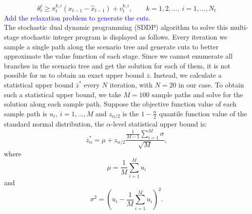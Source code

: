 \documentclass[12pt]{article}
\begin{document}
	\begin{equation}
		\theta_t^i \geq \pi_t^{k,i}(x_{t-1} - \hat{x}_{t-1}) + v_t^{k,i}, \qquad k = 1, 2, \dots,\ i = 1, \dots, N_t
	\end{equation}
	\textcolor{blue}{Add the relaxation problem to generate the cuts.}\\
	\newline
	The stochastic dual dynamic programming (SDDP) algorithm to solve this multi-stage stochastic integer program is displayed as follows. Every iteration we sample a single path along the scenario tree and generate cuts to better approximate the value function of each stage. Since we cannot enumerate all branches in the scenario tree and get the solution for each of them, it is not possible for us to obtain an exact upper bound \(\overline{z}\). Instead, we calculate a statistical upper bound \(\overline{z}^*\) every \(N\) iteration, with \(N = 20\) in our case. To obtain such a statistical upper bound, we take \(M = 100\) sample paths and solve for the solution along each sample path. Suppose the objective function value of each sample path is \(u_i,\ i = 1, \dots, M\) and \(z_{\alpha/2}\) is the \(1 - \frac{\alpha}{2}\) quantile function value of the standard normal distribution, the \(\alpha\)-level statistical upper bound is:
	\begin{equation}
		\overline{z}^*_\alpha = \mu + z_{\alpha/2} \frac{\frac{1}{M-1}\sum_{i = 1}^{M} \sigma}{\sqrt{M}},
	\end{equation}
	where 
	\[\mu = \frac{1}{M}\sum_{i = 1}^{M} u_i \]
	and
	\[\sigma^2 = (u_i - \frac{1}{M}\sum_{i = 1}^{M} u_i)^2.\]
\end{document}
